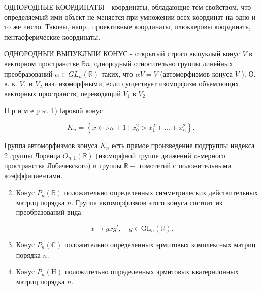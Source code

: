 \documentclass[10pt]{article}
\begin{document}
ОДНОРОДНЫЕ КООРДИНАТБІ - координаты, обладающие тем свойством, что определяемый ими объект не меняется при умножении всех координат на одно и то же число. Таковы, напр., проективные координаты, плюккеровы координать, пентасферические координаты.



ОДНОРОДНЫИ ВЫПУКЛЫІИ КОНУС - открытый строго выпуклый конус $V$ в векторном пространстве $\mathbb{R} n$, однородный относительно группы линейных преобразований $\alpha \in G L_{n}(\mathbb{R})$ таких, что $\alpha V=V$ (автоморфизмов конуса $V$ ). О. в. к. $V_{1}$ и $V_{2}$ наз. изоморфными, если существует изоморфизм объемлющих векторных пространств, переводящий $V_{1}$ в $V_{2}$



П р и м е р ы. 1) Іаровой конус



\[

K_{n}=\left\{x \in \mathbb{R} n+1 \mid x_{0}^{2}>x_{1}^{2}+\ldots+x_{n}^{2}\right\} \text {. }

\]



Группа автоморфизмов конуса $K_{n}$ есть прямое произведение подгруппы индекса 2 группы Лоренца $O_{n, 1}(\mathbb{R})$ (изоморфной группе движений $n$-мерного пространства Лобачевского) и группы $\mathbb{R}+$ гомотетий с положительными коэфффициентами.



\begin{enumerate}

  \setcounter{enumi}{1}

  \item Конус $P_{n}(\mathbb{R})$ положительно определенных симметрических действительных матриц порядка $n$. Группа автоморфизмов этого конуса состоит из преобразований вида

\end{enumerate}



\[

x \longrightarrow g x g^{t}, \quad g \in \mathrm{GL}_{n}(\mathbb{R}) .

\]



\begin{enumerate}

  \setcounter{enumi}{2}

  \item Конус $P_{n}(\mathbb{C})$ положительно определенных эрмитовых комплексных матриц порядка $n$.



  \item Конус $P_{n}(\mathrm{H})$ положительно определенных эрмитовых кватернионных матриц порядка $n$.



\end{enumerate}
\end{document}
